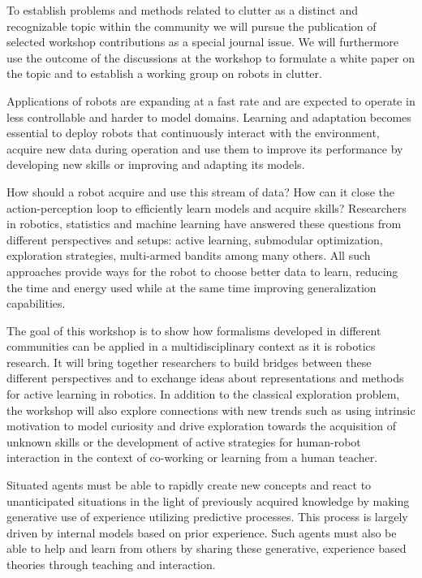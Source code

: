 \begin{spacing}{1.0}
{To establish problems and methods related to clutter as a distinct and recognizable topic within the community we will pursue the publication of selected workshop contributions as a special journal issue. We will furthermore use the outcome of the discussions at the workshop to formulate a white paper on the topic and to establish a working group on robots in clutter.
}


{
Applications of robots are expanding at a fast rate and are expected to operate in less controllable and harder to model domains. Learning and adaptation becomes essential to deploy robots that continuously interact with the environment, acquire new data during operation and use them to improve its performance by developing new skills or improving and adapting its models.

How should a robot acquire and use this stream of data? How can it close the action-perception loop to efficiently learn models and acquire skills? Researchers in robotics, statistics and machine learning have answered these questions from different perspectives and setups: active learning, submodular optimization, exploration strategies, multi-armed bandits among many others. All such approaches provide ways for the robot to choose better data to learn, reducing the time and energy used while at the same time improving generalization capabilities.

The goal of this workshop is to show how formalisms developed in different communities can be applied in a multidisciplinary context as it is robotics research. It will bring together researchers to build bridges between these different perspectives and to exchange ideas about representations and methods for active learning in robotics. In addition to the classical exploration problem, the workshop will also explore connections with new trends such as using intrinsic motivation to model curiosity and drive exploration towards the acquisition of unknown skills or the development of active strategies for human-robot interaction in the context of co-working or learning from a human teacher. 
}


{
Situated agents must be able to rapidly create new concepts and react to unanticipated situations in the light of previously acquired knowledge by making generative use of experience utilizing predictive processes. This process is largely driven by internal models based on prior experience. Such agents must also be able to help and learn from others by sharing these generative, experience based theories through teaching and interaction.

}
\end{spacing}
